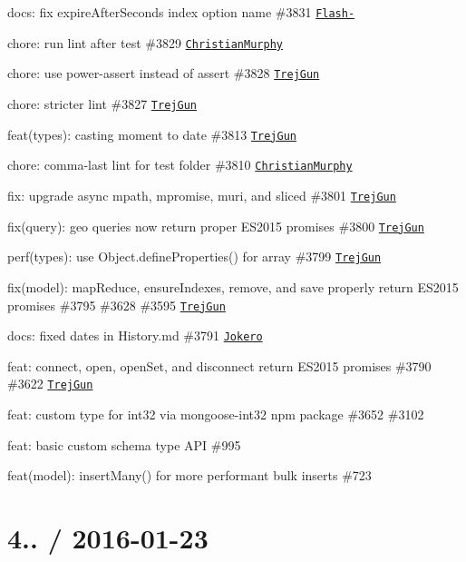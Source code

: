\begin{DoxyItemize}
\item docs\+: fix expire\+After\+Seconds index option name \#3831 \href{https://github.com/Flash-}{\tt Flash-\/}
\item chore\+: run lint after test \#3829 \href{https://github.com/ChristianMurphy}{\tt Christian\+Murphy}
\item chore\+: use power-\/assert instead of assert \#3828 \href{https://github.com/TrejGun}{\tt Trej\+Gun}
\item chore\+: stricter lint \#3827 \href{https://github.com/TrejGun}{\tt Trej\+Gun}
\item feat(types)\+: casting moment to date \#3813 \href{https://github.com/TrejGun}{\tt Trej\+Gun}
\item chore\+: comma-\/last lint for test folder \#3810 \href{https://github.com/ChristianMurphy}{\tt Christian\+Murphy}
\item fix\+: upgrade async mpath, mpromise, muri, and sliced \#3801 \href{https://github.com/TrejGun}{\tt Trej\+Gun}
\item fix(query)\+: geo queries now return proper E\+S2015 promises \#3800 \href{https://github.com/TrejGun}{\tt Trej\+Gun}
\item perf(types)\+: use {\ttfamily Object.\+define\+Properties()} for array \#3799 \href{https://github.com/TrejGun}{\tt Trej\+Gun}
\item fix(model)\+: map\+Reduce, ensure\+Indexes, remove, and save properly return E\+S2015 promises \#3795 \#3628 \#3595 \href{https://github.com/TrejGun}{\tt Trej\+Gun}
\item docs\+: fixed dates in History.\+md \#3791 \href{https://github.com/Jokero}{\tt Jokero}
\item feat\+: connect, open, open\+Set, and disconnect return E\+S2015 promises \#3790 \#3622 \href{https://github.com/TrejGun}{\tt Trej\+Gun}
\item feat\+: custom type for int32 via mongoose-\/int32 npm package \#3652 \#3102
\item feat\+: basic custom schema type A\+PI \#995
\item feat(model)\+: {\ttfamily insert\+Many()} for more performant bulk inserts \#723
\end{DoxyItemize}

\section*{4.. / 2016-\/01-\/23 }



